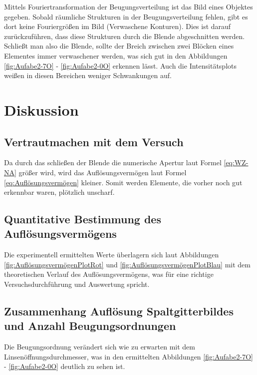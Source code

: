 \documentclass[12pt,a4paper,twoside]{article}
\begin{document}
\noindent
Mittels Fouriertransformation der Beugungsverteilung ist das Bild eines Objektes gegeben. Sobald räumliche Strukturen in der Beugungsverteilung fehlen, gibt es dort keine Fouriergrößen im Bild (Verwaschene Konturen). 
Dies ist darauf zurückzuführen, dass diese Strukturen durch die Blende abgeschnitten werden. 
Schließt man also die Blende, sollte der Breich zwischen zwei Blöcken eines Elementes immer verwaschener werden, was sich gut in den Abbildungen \ref{fig:Aufabe2-7O} - \ref{fig:Aufabe2-0O} erkennen lässt.
Auch die Intensitätsplots weißen in diesen Bereichen weniger Schwankungen auf. \cite{dem2}



\section{Diskussion} %

\subsection{Vertrautmachen mit dem Versuch}

Da durch das schließen der Blende die numerische Apertur laut Formel \ref{eq:WZ-NA} größer wird, wird das Auflösungsvermögen laut Formel \ref{eq:Auflösungsvermögen} kleiner. Somit werden Elemente, die vorher noch gut erkennbar waren, plötzlich unscharf.


\subsection{Quantitative Bestimmung des Auflösungsvermögens}

Die experimentell ermittelten Werte überlagern sich laut Abbildungen \ref{fig:AuflösungsvermögenPlotRot} und \ref{fig:AuflösungsvermögenPlotBlau} mit dem theoretischen Verlauf des Auflösungsvermögens, was für eine richtige Versuchsdurchführung und Auswertung spricht.


\subsection{Zusammenhang Auflösung Spaltgitterbildes und Anzahl Beugungsordnungen}

Die Beugungsordnung verändert sich wie zu erwarten mit dem Linsenöffnungsdurchmesser, was in den ermittelten Abbildungen \ref{fig:Aufabe2-7O} - \ref{fig:Aufabe2-0O} deutlich zu sehen ist.
\end{document}
